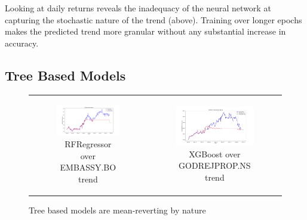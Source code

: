 \documentclass[11pt]{article}
\begin{document}
Looking at daily returns reveals the inadequacy of the neural network at capturing the stochastic nature of the trend (above). Training over longer epochs makes the predicted trend more granular without any substantial increase in accuracy.


\subsection{Tree Based Models}

\begin{figure}[h!]
    \centering
    \begin{tabular}{cc}
        \begin{subfigure}[b]{0.48\textwidth}
            \centering
            \includegraphics[width=\linewidth]{figures/rf/EMBASSY_predict.png}
            \caption{RFRegressor over EMBASSY.BO trend}
            \label{fig:1a}
        \end{subfigure} &
        \begin{subfigure}[b]{0.48\textwidth}
            \centering
            \includegraphics[width=\linewidth]{figures/xgboost/GODREJPROP_predict.png}
            \caption{XGBoost over GODREJPROP.NS trend}
            \label{fig:1b}
        \end{subfigure} \\
    \end{tabular}
    \caption{Tree based models are mean-reverting by nature}
    \label{fig:4x2grid}
\end{figure}
\end{document}
